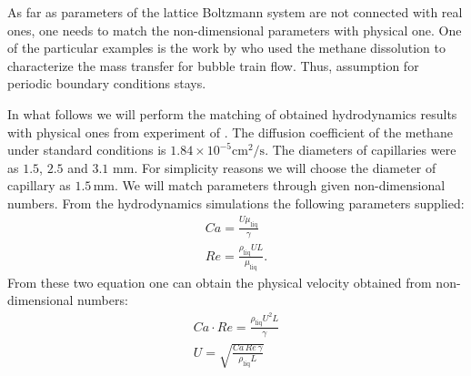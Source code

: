 \documentclass{article}
\begin{document}
As far as parameters of the lattice Boltzmann system are not connected with real ones, one needs to
match the non-dimensional parameters with physical one.  One of the particular examples is the
work by \citet{bercic-mass} who used the methane dissolution to characterize the mass transfer for
bubble train flow. Thus, assumption for periodic boundary conditions stays. 

In what follows we will perform the matching of obtained hydrodynamics results
\cite{kuzmin-binary2d} with physical ones from experiment of \citet{bercic-mass}. The diffusion
coefficient of the methane under standard conditions \cite{methane-properties} is
$1.84\times 10^{-5} \mathrm{cm}^2/\mathrm{s}$. The diameters of capillaries were as $1.5$, $2.5$ and
$3.1$ $\mathrm{mm}$. For simplicity reasons we will choose the diameter of capillary as $1.5\,
\mathrm{mm}$. 
We will match parameters through given non-dimensional numbers. From the hydrodynamics
simulations the following parameters supplied:
\begin{equation}
\begin{aligned}
Ca=\frac{U \mu_{\mathrm{liq}}}{\gamma}\\
Re=\frac{\rho_{\mathrm{liq}} U L}{\mu_{\mathrm{liq}}}.
\end{aligned}
\end{equation}
From these two equation one can obtain the physical velocity obtained from non-dimensional numbers:
\begin{equation}
\begin{aligned}
Ca\cdot Re= \frac{\rho_{\mathrm{liq}} U^2 L}{\gamma}\\
U=\sqrt{\frac{Ca\,Re\,\gamma}{\rho_{\mathrm{liq}}L}}
\end{aligned}
\end{equation}
\end{document}
